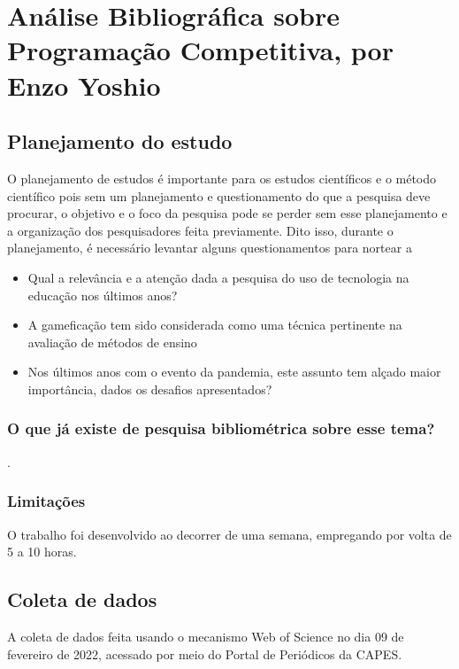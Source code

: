 \chapter{Análise Bibliográfica sobre Programação Competitiva, por Enzo Yoshio \label{chap:bibliometria:}}

\section{Planejamento do estudo\label{}}

    O planejamento de estudos é importante para os estudos científicos e o método científico pois sem um planejamento e questionamento do que a pesquisa deve procurar, o objetivo e o foco da pesquisa pode se perder sem esse planejamento e a organização dos pesquisadores feita previamente. Dito isso, durante o planejamento, é necessário levantar alguns questionamentos para nortear a
 

\begin{itemize}
    \item Qual a relevância e a atenção dada a pesquisa do uso de tecnologia na educação nos últimos anos?
    \item A gameficação tem sido considerada como uma técnica pertinente na avaliação de métodos de ensino
    \item Nos últimos anos com o evento da pandemia, este assunto tem alçado maior importância, dados os desafios apresentados?
\end{itemize}

\subsection{O que já existe de pesquisa bibliométrica sobre esse tema?}

\cite{} 
\cite{}.


\subsection{Limitações} O trabalho foi desenvolvido ao decorrer de uma semana, empregando por volta de 5 a 10 horas.

\section{Coleta de dados\label{MASSA:coleta}}

A coleta de dados feita usando o mecanismo Web of Science no dia 09 de fevereiro de 2022, acessado por meio do Portal de Periódicos da CAPES.


